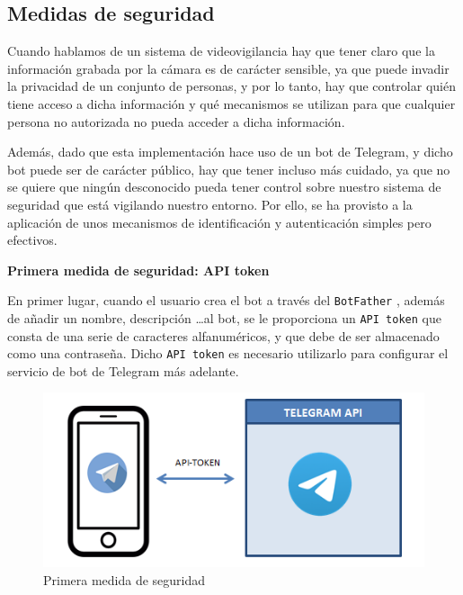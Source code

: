 


\pagestyle{miEstilo504}


\subsection{Medidas de seguridad}

Cuando hablamos de un sistema de videovigilancia hay que tener claro que la información grabada por la cámara es de carácter sensible, ya que puede invadir la privacidad de un conjunto de personas, y por lo tanto, hay que controlar quién tiene acceso a dicha información y qué mecanismos se utilizan para que cualquier persona no autorizada no pueda acceder a dicha información.

Además, dado que esta implementación hace uso de un bot de Telegram, y dicho bot puede ser de carácter público, hay que tener incluso más cuidado, ya que no se quiere que ningún desconocido pueda tener control sobre nuestro sistema de seguridad que está vigilando nuestro entorno. Por ello, se ha provisto a la aplicación de unos mecanismos de identificación y autenticación simples pero efectivos.

\textbf{Primera medida de seguridad: API token}

En primer lugar, cuando el usuario crea el bot a través del \texttt{BotFather} \cite{ref31}, además de añadir un nombre, descripción \ldots al bot, se le proporciona un \texttt{API token} que consta de una serie de caracteres alfanuméricos, y que debe de ser almacenado como una contraseña. Dicho \texttt{API token} es necesario utilizarlo para configurar el servicio de bot de Telegram más adelante. 


\begin{figure}[h]
	\centering
	\includegraphics[scale=0.35]{images/36}
	\caption{Primera medida de seguridad}
	\label{img:seg1}
\end{figure}

